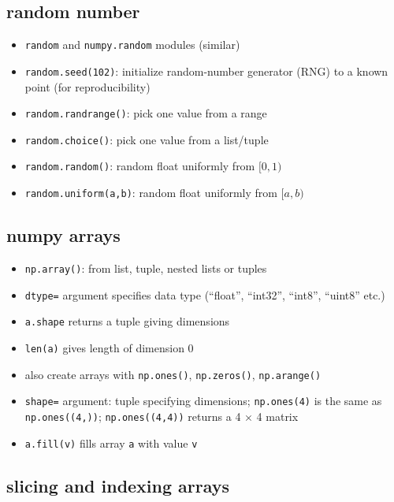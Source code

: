 \documentclass[]{tufte-handout}
\providecommand{\tightlist}{%
  \setlength{\itemsep}{0pt}\setlength{\parskip}{0pt}}
\begin{document}
\hypertarget{random-number}{%
\subsection{random number}\label{random-number}}

\begin{itemize}
\tightlist
\item
  \texttt{random} and \texttt{numpy.random} modules (similar)
\item
  \texttt{random.seed(102)}: initialize random-number generator (RNG) to
  a known point (for reproducibility)
\item
  \texttt{random.randrange()}: pick one value from a range
\item
  \texttt{random.choice()}: pick one value from a list/tuple
\item
  \texttt{random.random()}: random float uniformly from \([0,1)\)
\item
  \texttt{random.uniform(a,b)}: random float uniformly from \([a,b)\)
\end{itemize}

\hypertarget{numpy-arrays}{%
\subsection{numpy arrays}\label{numpy-arrays}}

\begin{itemize}
\tightlist
\item
  \texttt{np.array()}: from list, tuple, nested lists or tuples
\item
  \texttt{dtype=} argument specifies data type (``float'', ``int32'',
  ``int8'', ``uint8'' etc.)
\item
  \texttt{a.shape} returns a tuple giving dimensions
\item
  \texttt{len(a)} gives length of dimension 0
\item
  also create arrays with \texttt{np.ones()}, \texttt{np.zeros()},
  \texttt{np.arange()}
\item
  \texttt{shape=} argument: tuple specifying dimensions;
  \texttt{np.ones(4)} is the same as \texttt{np.ones((4,))};
  \texttt{np.ones((4,4))} returns a 4 \(\times\) 4 matrix
\item
  \texttt{a.fill(v)} fills array \texttt{a} with value \texttt{v}
\end{itemize}

\hypertarget{slicing-and-indexing-arrays}{%
\subsection{slicing and indexing
arrays}\label{slicing-and-indexing-arrays}}
\end{document}
